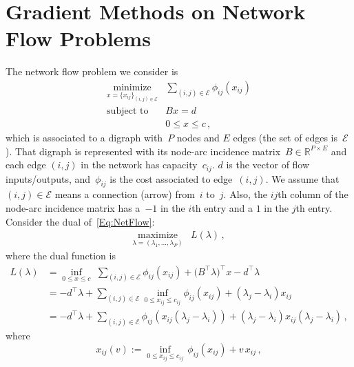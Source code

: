 \documentclass[letter,10pt]{article}
\theoremstyle{definition}
\theoremstyle{nonumberplain}
\begin{document}
\section*{Gradient Methods on Network Flow Problems}

	The network flow problem we consider is
	\begin{equation}\label{Eq:NetFlow}
		\begin{array}{cl}
			\underset{x = \{x_{ij}\}_{(i,j) \in \mathcal{E}}}{\text{minimize}}   & \sum_{(i,j) \in \mathcal{E}}  \phi_{ij}(x_{ij}) \\
			\text{subject to} & Bx = d \\
			                  & 0 \leq x \leq c\,,
		\end{array}
	\end{equation}
	which is associated to a digraph with~$P$ nodes and $E$ edges (the set of edges is~$\mathcal{E}$). That digraph is represented with its node-arc incidence matrix~$B \in \mathbb{R}^{P \times E}$ and each edge $(i,j)$ in the network has capacity~$c_{ij}$. $d$ is the vector of flow inputs/outputs, and~$\phi_{ij}$ is the cost associated to edge~$(i,j)$. We assume that $(i,j) \in \mathcal{E}$ means a connection (arrow) from~$i$ to~$j$. Also, the $ij$th column of the node-arc incidence matrix has a~$-1$ in the $i$th entry and a $1$ in the $j$th entry. Consider the dual of~\eqref{Eq:NetFlow}:
	\begin{equation}\label{Eq:DualNetFlow}
		\begin{array}{cl}
			\underset{\lambda = (\lambda_1,\ldots,\lambda_P)}{\text{maximize}} & L(\lambda) \,,
		\end{array}
	\end{equation}
	where the dual function is
	\begin{align*}
		  L(\lambda)
		&=
		  \inf_{0\leq x \leq c}\,\, \sum_{(i,j) \in \mathcal{E}} \phi_{ij}(x_{ij}) + \bigl(B^\top \lambda\bigr)^\top x - d^\top \lambda
		\\
		&=
		  - d^\top \lambda + \sum_{(i,j) \in \mathcal{E}} \inf_{0 \leq x_{ij} \leq c_{ij}} \phi_{ij}(x_{ij}) + (\lambda_j - \lambda_i)x_{ij}
		\\
		&=
		  -d^\top \lambda + \sum_{(i,j) \in \mathcal{E}} \phi_{ij}(x_{ij}(\lambda_j - \lambda_i)) + (\lambda_j - \lambda_i)x_{ij}(\lambda_j - \lambda_i)\,,
	\end{align*}
	where
	\begin{equation}\label{Eq:xv}
		x_{ij}(v) := \inf_{0\leq x_{ij} \leq c_{ij}} \, \phi_{ij}(x_{ij}) + v \,x_{ij}\,,
	\end{equation}
\end{document}
